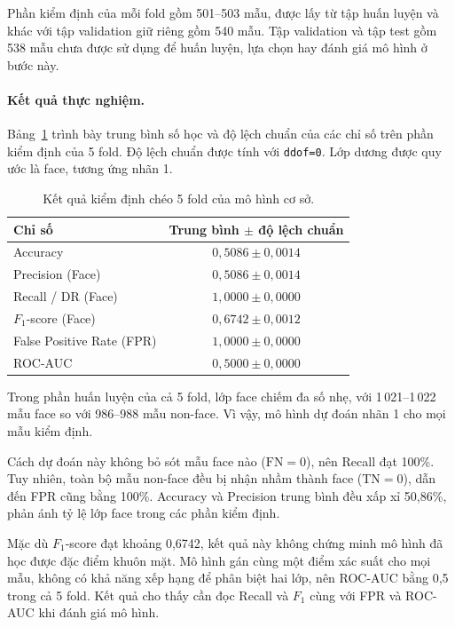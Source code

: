 \documentclass[12pt,a4paper,oneside]{report}
\begin{document}
Phần kiểm định của mỗi fold gồm 501--503 mẫu, được lấy từ
tập huấn luyện và khác với tập validation giữ riêng gồm
540 mẫu. Tập validation và tập test gồm 538 mẫu chưa được
sử dụng để huấn luyện, lựa chọn hay đánh giá mô hình ở bước này.

\paragraph{Kết quả thực nghiệm.}
Bảng~\ref{tab:baseline_results} trình bày trung bình số học
và độ lệch chuẩn của các chỉ số trên phần kiểm định của
5 fold. Độ lệch chuẩn được tính với \texttt{ddof=0}.
Lớp dương được quy ước là face, tương ứng nhãn 1.

\begin{table}[H]
    \centering
    \small
    \caption{Kết quả kiểm định chéo 5 fold của mô hình cơ sở.}
    \label{tab:baseline_results}
    \begin{tabular}{lc}
        \toprule
        \textbf{Chỉ số}
        & \textbf{Trung bình $\pm$ độ lệch chuẩn} \\
        \midrule
        Accuracy
        & $0{,}5086 \pm 0{,}0014$ \\
        Precision (Face)
        & $0{,}5086 \pm 0{,}0014$ \\
        Recall / DR (Face)
        & $1{,}0000 \pm 0{,}0000$ \\
        $F_1$-score (Face)
        & $0{,}6742 \pm 0{,}0012$ \\
        False Positive Rate (FPR)
        & $1{,}0000 \pm 0{,}0000$ \\
        ROC-AUC
        & $0{,}5000 \pm 0{,}0000$ \\
        \bottomrule
    \end{tabular}
\end{table}

Trong phần huấn luyện của cả 5 fold, lớp face chiếm đa số
nhẹ, với 1\,021--1\,022 mẫu face so với 986--988 mẫu non-face.
Vì vậy, mô hình dự đoán nhãn 1 cho mọi mẫu kiểm định.

Cách dự đoán này không bỏ sót mẫu face nào
($\mathrm{FN}=0$), nên Recall đạt 100\%.
Tuy nhiên, toàn bộ mẫu non-face đều bị nhận nhầm thành face
($\mathrm{TN}=0$), dẫn đến FPR cũng bằng 100\%.
Accuracy và Precision trung bình đều xấp xỉ 50,86\%,
phản ánh tỷ lệ lớp face trong các phần kiểm định.

Mặc dù $F_1$-score đạt khoảng 0,6742, kết quả này không chứng
minh mô hình đã học được đặc điểm khuôn mặt.
Mô hình gán cùng một điểm xác suất cho mọi mẫu,
không có khả năng xếp hạng để phân biệt hai lớp,
nên ROC-AUC bằng 0,5 trong cả 5 fold.
Kết quả cho thấy cần đọc Recall và $F_1$ cùng với FPR
và ROC-AUC khi đánh giá mô hình.
\end{document}
